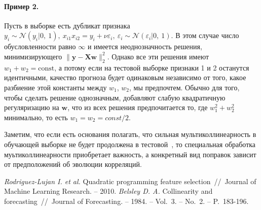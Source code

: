 \documentclass[12pt, a4paper]{article}
\newcommand{\xmatr}{\mathbf{X}}
\newcommand{\norm}{\mathcal{N}}
\newcommand{\yvec}{\mathbf{y}}
\newcommand{\wvec}{\mathbf{w}}
\begin{document}
\paragraph*{Пример 2.} Пусть в выборке есть дубликат признака $y_i \sim \norm(y_i|0,\:1),\:x_{i1} x_{i2} = y_i + \nu \varepsilon_{i},\:\varepsilon_{i} \sim \norm(\varepsilon_{i}|0,\:1)$. В этом случае число обусловленности равно $\infty$ и имеется неоднозначность решения, минимизирующего $\|\yvec - \xmatr \wvec\|_2^2$. Однако все эти решения имеют $w_1 + w_2 = \mathrm{const}$, а потому если на тестовой выборке признаки 1 и 2 останутся идентичными, качество прогноза будет одинаковым независимо от того, какое разбиение этой константы между $w_1$, $w_2$, мы предпочтем. Обычно для того, чтобы сделать решение однозначным, добавляют слабую квадратичную регуляризацию на $\wvec$, что из всех решения предпочитается то, где $w_1^2 + w_2^2$ минимально, то есть $w_1 = w_2 = const / 2$. 

Заметим, что если есть основания полагать, что сильная мультиколлинеарность в обучающей выборке не будет продолжена в тестовой~\cite{multicollinearity_need_no_continuation}, то специальная обработка муьтиколлинеарности приобретает важность, а конкретный вид поправок зависит от предположений об эволюции корреляций.

\begin{thebibliography}{99}

 \textit{Rodriguez-Lujan I. et al.} Quadratic programming feature selection~//~Journal of Machine Learning Research. – 2010.
\textit{Belsley D. A.} Collinearity and forecasting~//~Journal of Forecasting. – 1984. – Vol.~3. – No.~2. – P.~183-196.

\end{thebibliography}
\end{document}
